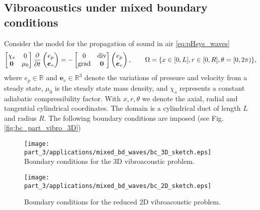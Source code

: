 \subsection{Vibroacoustics under mixed boundary conditions}
Consider the model for the propagation of sound in air \ref{eq:pHsys_waves}
\begin{equation}
\begin{bmatrix}
\chi_s & 0 \\
\bm{0} & \mu_0 \\
\end{bmatrix}
\diffp{}{t}
\begin{pmatrix}
e_p \\
\bm{e}_v \\
\end{pmatrix} = -
\begin{bmatrix}
0 & \div \\
\grad & \bm{0} \\
\end{bmatrix}
\begin{pmatrix}
e_p \\
\bm{e}_v \\
\end{pmatrix}, \qquad \Omega = \{x \in [0, L], r \in [0, R], \theta = [0, 2 \pi)\},
\end{equation}
where $e_p \in \mathbb{R}$  and $\bm{e}_v \in \mathbb{R}^3$ denote the variations of pressure and velocity from a steady state, $\mu_0$ is the steady state mass density, and $\chi_s$ represents a constant adiabatic compressibility factor. With $x, r, \theta$ we denote the axial, radial and tangential cylindrical coordinates.  The domain is a cylindrical duct of length $L$ and radius $R$. The following boundary conditions are imposed (see Fig. \ref{fig:bc_part_vibro_3D})

\begin{figure}[t]
	\begin{minipage}[b]{0.48\linewidth}
		\centering
		\texttt{[image: part\_3/applications/mixed\_bd\_waves/bc\_3D\_sketch.eps]} \\
		\caption{Boundary conditions for the 3D vibroacoustic problem.}
		\label{fig:bc_part_vibro_3D}
	\end{minipage}
	\hspace{0.5cm}
	\begin{minipage}[b]{0.48\linewidth}
		\centering
	\texttt{[image: part\_3/applications/mixed\_bd\_waves/bc\_2D\_sketch.eps]} \\
	\caption{Boundary conditions for the reduced 2D vibroacoustic problem.}
	\label{fig:bc_part_vibro_2D}
	\end{minipage}
\end{figure}



